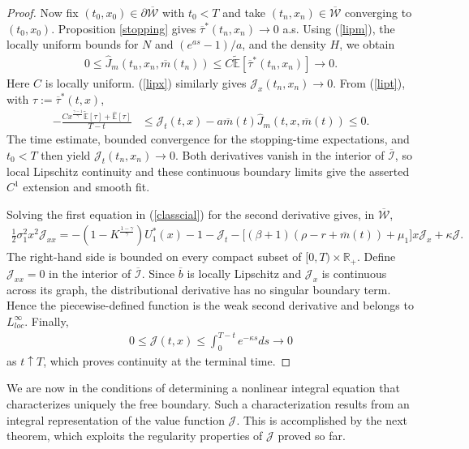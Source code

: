 \documentclass[a4paper,11pt]{amsart}
\numberwithin{equation}{section}
\begin{document}
{{\begin{proof}
{  Now fix $(t_0,x_0)\in\partial\overline{\mathcal W}$ with $t_0<T$ and take $(t_n,x_n)\in\overline{\mathcal W}$ converging to $(t_0,x_0)$. Proposition \ref{stopping} gives $\overline\tau^\ast(t_n,x_n)\to0$ a.s. Using (\ref{lipm}), the locally uniform bounds for $N$ and $(e^{as}-1)/a$, and the density $H$, we obtain
\begin{align*}
0\leq\widehat J_m(t_n,x_n,\overline m(t_n))
\leq C\widetilde{\mathbb E}[\overline\tau^\ast(t_n,x_n)]\longrightarrow0.
\end{align*}
Here $C$ is locally uniform. (\ref{lipx}) similarly gives $\mathcal J_x(t_n,x_n)\to0$. From (\ref{lipt}), with $\tau:=\overline\tau^\ast(t,x)$,
\begin{align*}
-\frac{Cx^{\frac{\gamma-1}{\gamma}}\widetilde{\mathbb E}[\tau]+\widehat{\mathbb E}[\tau]}{T-t}
&\leq\mathcal J_t(t,x)-a\overline m(t)\widehat J_m(t,x,\overline m(t))\leq0.
\end{align*}
The time estimate, bounded convergence for the stopping-time expectations, and $t_0<T$ then yield $\mathcal J_t(t_n,x_n)\to0$. 
 Both derivatives vanish in the interior of $\overline{\mathcal I}$, so local Lipschitz continuity and these continuous boundary limits give the asserted $C^1$ extension and smooth fit.
}

Solving the first equation in (\ref{classcial}) for the second derivative gives, in $\overline{\mathcal W}$,
\begin{align*}
\frac{1}{2}\sigma_1^2x^2\mathcal J_{xx}=-(1-K^{\frac{1-\gamma}{\gamma}})U_1^\ast(x)-1-\mathcal J_t
-\Big[(\beta+1)(\rho-r+\overline m(t))+\mu_1\Big]x\mathcal J_x+\kappa\mathcal J.
\end{align*}
The right-hand side is bounded on every compact subset of $[0,T)\times\mathbb R_+$. Define $\mathcal J_{xx}=0$ in the interior of $\overline{\mathcal I}$. Since $\overline b$ is locally Lipschitz and $\mathcal J_x$ is continuous across its graph, the distributional derivative has no singular boundary term. Hence the piecewise-defined function is the weak second derivative and belongs to $L^\infty_{loc}$. Finally,
\begin{align*}
0\leq\mathcal J(t,x)\leq\int_0^{T-t}e^{-\kappa s}ds\longrightarrow0
\end{align*}
as $t\uparrow T$, which proves continuity at the terminal time.
\end{proof}


We are now in the conditions of determining a nonlinear integral equation that characterizes uniquely the free boundary. Such a characterization results from an integral representation of the value function $\mathcal{J}$. This is accomplished by the next theorem, which exploits the regularity properties of $\mathcal{J}$ proved so far.

}}
\end{document}
